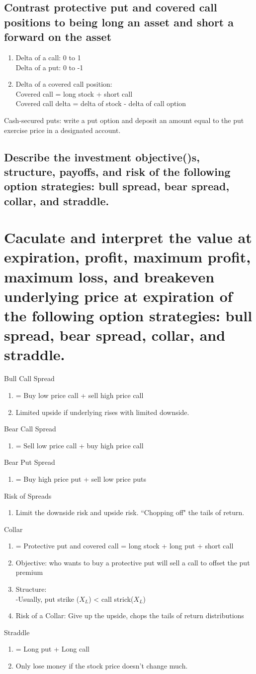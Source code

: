 \documentclass{article}
\newcommand{\be}{\begin{enumerate}}
\newcommand{\ee}{\end{enumerate}}
\begin{document}
\subsection{Contrast protective put and covered call positions to being long an asset and short
a forward on the asset}
\be
    \item 
    Delta of a call: 0 to 1
    \\Delta of a put: 0 to -1
    \item Delta of a covered call position:
    \\ Covered call = long stock + short call
    \\ Covered call delta = delta of stock - delta of call option
\ee
Cash-secured puts: write a put option and deposit an amount equal to the put exercise price
in a designated account.

\subsection{Describe the investment objective()s, structure, payoffs, and risk of the following
option strategies: bull spread, bear spread, collar, and straddle.}
\section{Caculate and interpret the value at expiration, profit, maximum profit, maximum loss,
and breakeven underlying price at expiration of the following option strategies: 
bull spread, bear spread, collar, and straddle.}
Bull Call Spread
\be
    \item = Buy low price call + sell high price call
    \item Limited upside if underlying rises with limited downside.
\ee
Bear Call Spread
\be
    \item = Sell low price call + buy high price call
\ee
Bear Put Spread
\be
    \item = Buy high price put + sell low price puts
\ee
Risk of Spreads
\be
    \item Limit the downside risk and upside risk. ``Chopping off" the tails of return.
\ee
Collar
\be
    \item = Protective put and covered call = long stock + long put + short call
    \item Objective: who wants to buy a protective put will sell a call to offset the put premium
    \item Structure: 
        \\-Usually, put strike ($X_L$) < call strick($X_L$)
    \item Risk of a Collar: Give up the upside, chops the tails of return distributions
\ee
Straddle
\be
    \item = Long put + Long call
    \item Only lose money if the stock price doesn't change much.
\ee
\end{document}
